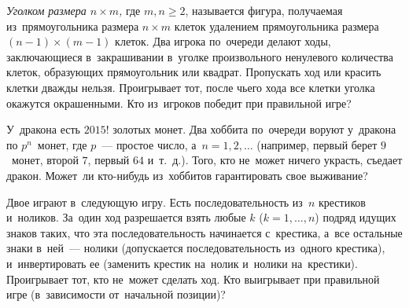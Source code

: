 \begin{problems}
\item
\emph{Уголком размера $n \times m$,} где $m, n \geq 2$, называется фигура, получаемая
из~прямоугольника размера $n \times m$ клеток удалением прямоугольника размера
$(n - 1) \times (m - 1)$ клеток.
Два игрока по~очереди делают ходы, заключающиеся в~закрашивании в~уголке
произвольного ненулевого количества клеток, образующих прямоугольник или
квадрат.
Пропускать ход или красить клетки дважды нельзя.
Проигрывает тот, после чьего хода все клетки уголка окажутся окрашенными.
Кто из~игроков победит при правильной игре?

\item
У~дракона есть $2015!$ золотых монет.
Два хоббита по~очереди воруют у~дракона по $p^n$~монет, где $p$~--- простое
число, а~$n = 1, 2, \ldots$
(например, первый берет $9$~монет, второй $7$, первый $64$ и~т.~д.).
Того, кто не~может ничего украсть, съедает дракон.
Может~ли кто-нибудь из~хоббитов гарантировать свое выживание?

\item
Двое играют в~следующую игру.
Есть последовательность из~$n$ крестиков и~ноликов.
За~один ход разрешается взять любые $k$ ($k = 1, \ldots, n$) подряд идущих
знаков таких, что эта последовательность начинается с~крестика, а~все остальные
знаки в~ней~--- нолики (допускается последовательность из~одного крестика),
и~инвертировать ее (заменить крестик на~нолик и~нолики на~крестики).
Проигрывает тот, кто не~может сделать ход.
Кто выигрывает при правильной игре (в~зависимости от~начальной позиции)?

\end{problems}

